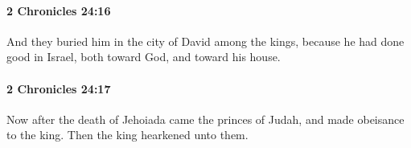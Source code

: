 		\paragraph{2 Chronicles 24:16} %
			\label{2CHRONICLES-24-16}

			And they buried him in the city of David among the kings, because he had done good in Israel, both toward God, and toward his house.


		\paragraph{2 Chronicles 24:17} %
			\label{2CHRONICLES-24-17}

			Now after the death of Jehoiada came the princes of Judah, and made obeisance to the king. Then the king hearkened unto them.


